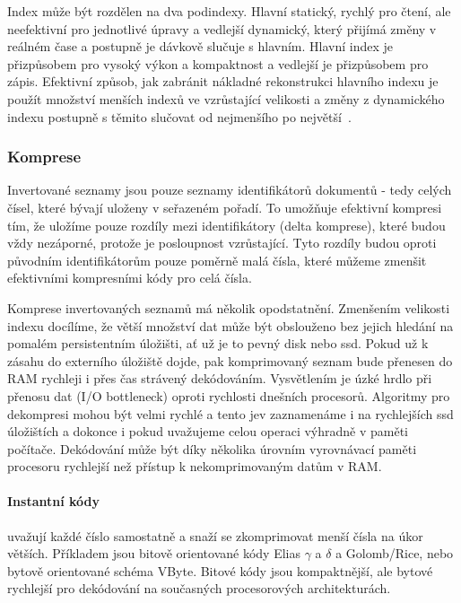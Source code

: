 \documentclass[11pt,letterpaper,oneside,openright]{book}
\begin{document}
Index může být rozdělen na dva podindexy. Hlavní statický, rychlý pro čtení,
ale neefektivní pro jednotlivé úpravy a vedlejší dynamický, který přijímá změny
v reálném čase a postupně je dávkově slučuje s hlavním. Hlavní index je
přizpůsobem pro vysoký výkon a kompaktnost a vedlejší je přizpůsobem pro zápis.
Efektivní způsob, jak zabránit nákladné rekonstrukci hlavního indexu je použít
množství menších indexů ve vzrůstající velikosti a změny z dynamického indexu
postupně s těmito slučovat od nejmenšího po
největší~\citep[kap.~4]{Manning:2008:IIR:1394399}.

\subsubsection{Komprese} \label{sec:compression}
Invertované seznamy jsou pouze seznamy identifikátorů dokumentů - tedy celých
čísel, které bývají uloženy v seřazeném pořadí. To umožňuje efektivní kompresi
tím, že uložíme pouze rozdíly mezi identifikátory (delta komprese), které budou
vždy nezáporné, protože je posloupnost vzrůstající. Tyto rozdíly budou oproti
původním identifikátorům pouze poměrně malá čísla, které můžeme zmenšit
efektivními kompresními kódy pro celá čísla.

Komprese invertovaných seznamů má několik opodstatnění. Zmenšením velikosti
indexu docílíme, že větší množství dat může být obslouženo bez jejich hledání
na pomalém persistentním úložišti, ať už je to pevný disk nebo ssd. Pokud už k
zásahu do externího úložiště dojde, pak komprimovaný seznam bude přenesen do
RAM rychleji i přes čas strávený dekódováním. Vysvětlením je úzké hrdlo při
přenosu dat (I/O bottleneck) oproti rychlosti dnešních procesorů. Algoritmy pro
dekompresi mohou být velmi rychlé a tento jev zaznamenáme i na rychlejších ssd
úložištích a dokonce i pokud uvažujeme celou operaci výhradně v paměti
počítače. Dekódování může být díky několika úrovním vyrovnávací paměti
procesoru rychlejší než přístup k nekomprimovaným datům v RAM.

\paragraph{Instantní kódy} uvažují každé číslo samostatně a snaží se
zkomprimovat menší čísla na úkor větších. Příkladem jsou bitově orientované
kódy Elias $\gamma$ a $\delta$ a Golomb/Rice, nebo bytově orientované schéma
VByte. Bitové kódy jsou kompaktnější, ale bytové rychlejší pro dekódování na
současných procesorových architekturách.
\end{document}
